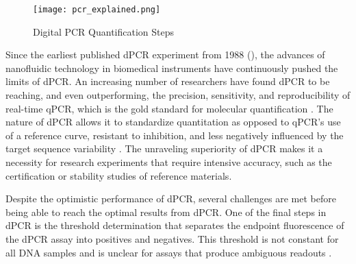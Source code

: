 \begin{figure}[h]
    \centering
    \texttt{[image: pcr\_explained.png]}
    \caption[Digital PCR Quantification Steps]{Digital PCR Quantification Steps}
        \label{fig:pcr_explained}
\end{figure}

Since the earliest published dPCR experiment from 1988 (\citeauthor{Saiki1988}), the advances of nanofluidic technology in biomedical instruments have continuously pushed the limits of dPCR. An increasing number of researchers have found dPCR to be reaching, and even outperforming, the precision, sensitivity, and reproducibility of real-time qPCR, which is the gold standard for molecular quantification \cite{Chen2018, Persson2018, Taylor2017, Arvia2017, Blaya2016, Jones2016, Sanders2011}. The nature of dPCR allows it to standardize quantitation as opposed to qPCR's use of a reference curve, resistant to inhibition, and less negatively influenced by the target sequence variability \cite{Sedlak2014}. The unraveling superiority of dPCR makes it a necessity for research experiments that require intensive accuracy, such as the certification or stability studies of reference materials.


Despite the optimistic performance of dPCR, several challenges are met before being able to reach the optimal results from dPCR. One of the final steps in dPCR is the threshold determination that separates the endpoint fluorescence of the dPCR assay into positives and negatives. This threshold is not constant for all DNA samples and is unclear for assays that produce ambiguous readouts \cite{Trypsteen2015}.

